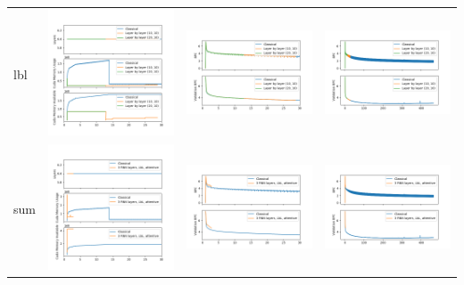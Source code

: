 \begin{longtable}[]{@{}llll@{}}
lbl & 
\includegraphics[width=.31\textwidth]{parts/appendix/reports-gmsnn/docs_esteban-latex/test_reports/2018-06-27/lbl_memory.png} & 
\includegraphics[width=.31\textwidth]{parts/appendix/reports-gmsnn/docs_esteban-latex/test_reports/2018-06-27/lbl_frac.png} &
\includegraphics[width=.31\textwidth]{parts/appendix/reports-gmsnn/docs_esteban-latex/test_reports/2018-06-27/lbl_frac_full.png}\tabularnewline

sum & 
\includegraphics[width=.31\textwidth]{parts/appendix/reports-gmsnn/docs_esteban-latex/test_reports/2018-06-27/sum_memory.png} &
 \includegraphics[width=.31\textwidth]{parts/appendix/reports-gmsnn/docs_esteban-latex/test_reports/2018-06-27/sum_frac.png} &
\includegraphics[width=.31\textwidth]{parts/appendix/reports-gmsnn/docs_esteban-latex/test_reports/2018-06-27/sum_frac_full.png}\tabularnewline
\hline
\end{longtable}

